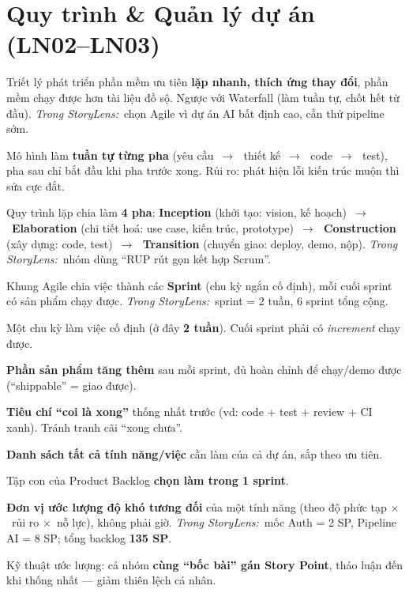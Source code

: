 \documentclass[11pt]{article}
\newcommand{\arr}{\,\ensuremath{\rightarrow}\,}
\newcommand{\x}{\ensuremath{\times}}
\newcommand{\insl}{\textit{\textcolor{steel}{Trong StoryLens:}}\ }
\begin{document}
\section{Quy trình \& Quản lý dự án (LN02--LN03)}
\begin{terms}
\item[Agile.] Triết lý phát triển phần mềm ưu tiên \textbf{lặp nhanh, thích ứng thay đổi}, phần mềm chạy được hơn tài liệu đồ sộ. Ngược với Waterfall (làm tuần tự, chốt hết từ đầu). \insl chọn Agile vì dự án AI bất định cao, cần thử pipeline sớm.
\item[Waterfall (Thác nước).] Mô hình làm \textbf{tuần tự từng pha} (yêu cầu \arr\ thiết kế \arr\ code \arr\ test), pha sau chỉ bắt đầu khi pha trước xong. Rủi ro: phát hiện lỗi kiến trúc muộn thì sửa cực đắt.
\item[RUP (Rational Unified Process).] Quy trình lặp chia làm \textbf{4 pha}: \textbf{Inception} (khởi tạo: vision, kế hoạch) \arr\ \textbf{Elaboration} (chi tiết hoá: use case, kiến trúc, prototype) \arr\ \textbf{Construction} (xây dựng: code, test) \arr\ \textbf{Transition} (chuyển giao: deploy, demo, nộp). \insl nhóm dùng ``RUP rút gọn kết hợp Scrum''.
\item[Scrum.] Khung Agile chia việc thành các \textbf{Sprint} (chu kỳ ngắn cố định), mỗi cuối sprint có sản phẩm chạy được. \insl sprint = 2 tuần, 6 sprint tổng cộng.
\item[Sprint.] Một chu kỳ làm việc cố định (ở đây \textbf{2 tuần}). Cuối sprint phải có \textit{increment} chạy được.
\item[Increment / Shippable increment.] \textbf{Phần sản phẩm tăng thêm} sau mỗi sprint, đủ hoàn chỉnh để chạy/demo được (``shippable'' = giao được).
\item[Definition of Done (DoD).] \textbf{Tiêu chí ``coi là xong''} thống nhất trước (vd: code + test + review + CI xanh). Tránh tranh cãi ``xong chưa''.
\item[Product Backlog.] \textbf{Danh sách tất cả tính năng/việc} cần làm của cả dự án, sắp theo ưu tiên.
\item[Sprint Backlog.] Tập con của Product Backlog \textbf{chọn làm trong 1 sprint}.
\item[Story Point (SP).] \textbf{Đơn vị ước lượng độ khó tương đối} của một tính năng (theo độ phức tạp \x\ rủi ro \x\ nỗ lực), không phải giờ. \insl mốc Auth = 2 SP, Pipeline AI = 8 SP; tổng backlog \textbf{135 SP}.
\item[Planning Poker.] Kỹ thuật ước lượng: cả nhóm \textbf{cùng ``bốc bài'' gán Story Point}, thảo luận đến khi thống nhất --- giảm thiên lệch cá nhân.

\end{terms}
\end{document}

